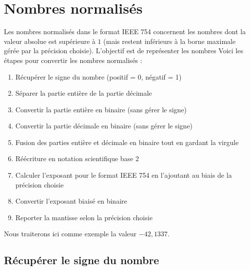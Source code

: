 \documentclass[11pt,a4paper]{article}
\begin{document}
\bigskip




\section{Nombres normalisés}

\bigskip

Les nombres normalisés dans le format IEEE 754 concernent les nombres dont la valeur absolue est supérieure à $ 1 $ (mais restent inférieurs à la borne maximale gérée par la précision choisie).
L'objectif est de représenter les nombres 
Voici les étapes pour convertir les nombres normalisés :

\medskip

\begin{enumerate}
\item Récupérer le signe du nombre (positif = 0, négatif = 1)
\item Séparer la partie entière de la partie décimale
\item Convertir la partie entière en binaire (sans gérer le signe)
\item Convertir la partie décimale en binaire (sans gérer le signe)
\item Fusion des parties entière et décimale en binaire tout en gardant la virgule
\item Réécriture en notation scientifique base 2
\item Calculer l'exposant pour le format IEEE 754 en l'ajoutant au biais de la précision choisie
\item Convertir l'exposant biaisé en binaire
\item Reporter la mantisse selon la précision choisie
\end{enumerate}

\bigskip

Nous traiterons ici comme exemple la valeur $ - 42,1337 $.

\bigskip

\subsection{Récupérer le signe du nombre}

\medskip
\end{document}
